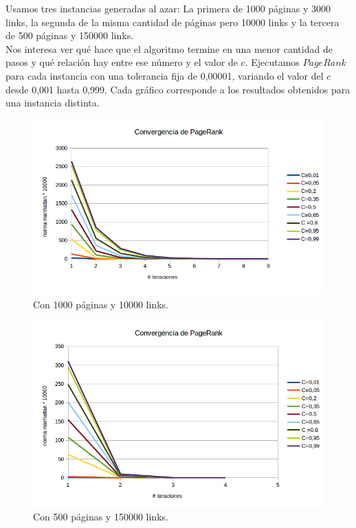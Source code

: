 Usamos tres instancias generadas al azar: La primera de 1000 páginas y 3000 links, la segunda de la misma cantidad de páginas pero 10000 links y la tercera de 500 páginas y 150000 links.\\

Nos interesa ver qué hace que el algoritmo termine en una menor cantidad de pasos y qué relación hay entre ese número y el valor de $c$. Ejecutamos $PageRank$ para cada instancia con una tolerancia fija de 0,00001, variando el valor del $c$ desde 0,001 hasta 0,999. Cada gráfico corresponde a los resultados obtenidos para una instancia distinta.\\



\begin{figure}[h]
  \includegraphics[scale= 0.6]{imagenes/convergencia2.png}
   \caption{Con  1000 páginas y  10000 links.}
  \label{fig:img1}
\end{figure}


\newpage

\begin{figure}
  \vspace{-20pt}
  \begin{center}
    \includegraphics[scale= 0.6]{imagenes/convergencia3.png}
  \end{center}
  \vspace{-20pt}
   \caption{Con  500 páginas y  150000 links.}
  \vspace{-10pt}
  \label{fig:img1}
\end{figure}

